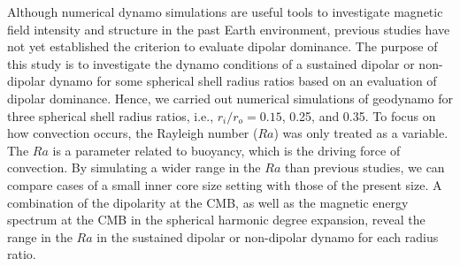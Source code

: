 Although numerical dynamo simulations are useful tools to investigate magnetic field intensity and structure in the past Earth environment, previous studies have not yet established the criterion to evaluate dipolar dominance. 
The purpose of this study is to investigate the dynamo conditions of a sustained dipolar or non-dipolar dynamo for some spherical shell radius ratios based on an evaluation of dipolar dominance.
Hence, we carried out numerical simulations of geodynamo for three spherical shell radius ratios, i.e., $r_{i} / r_{o} = 0.15$, 0.25, and 0.35. 
To focus on how convection occurs, the Rayleigh number ($Ra$) was only treated as a variable. The $Ra$ is a parameter related to buoyancy, which is the driving force of convection. By simulating a wider range in the $Ra$ than previous studies, we can compare cases of a small inner core size setting with those of the present size. 
A combination of the dipolarity at the CMB, as well as the magnetic energy spectrum at the CMB in the spherical harmonic degree expansion, reveal the range in the $Ra$ in the sustained dipolar or non-dipolar dynamo for each radius ratio.
